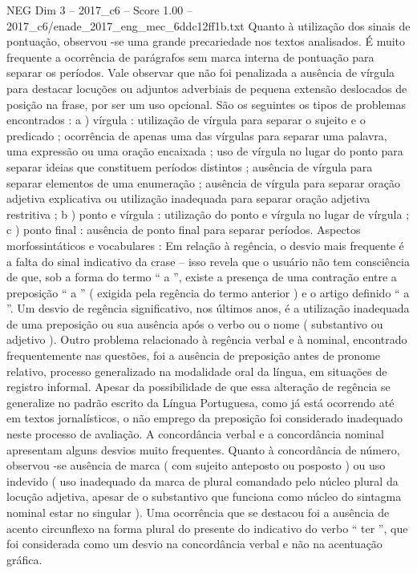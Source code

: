 \begin{textsample}{NEG Dim 3 – 2017\_c6 – Score 1.00 – 2017\_c6/enade\_2017\_eng\_mec\_6ddc12ff1b.txt}
Quanto à utilização dos sinais de pontuação, observou -se uma grande precariedade nos textos analisados.
É muito frequente a ocorrência de parágrafos sem marca interna de pontuação para separar os períodos.
Vale observar que não foi penalizada a ausência de vírgula para destacar locuções ou adjuntos adverbiais de pequena extensão deslocados de posição na frase, por ser um uso opcional.
São os seguintes os tipos de problemas encontrados : a ) vírgula : utilização de vírgula para separar o sujeito e o predicado ; ocorrência de apenas uma das vírgulas para separar uma palavra, uma expressão ou uma oração encaixada ; uso de vírgula no lugar do ponto para separar ideias que constituem períodos distintos ; ausência de vírgula para separar elementos de uma enumeração ; ausência de vírgula para separar oração adjetiva explicativa ou utilização inadequada para separar oração adjetiva restritiva ; b ) ponto e vírgula : utilização do ponto e vírgula no lugar de vírgula ; c ) ponto final : ausência de ponto final para separar períodos.
Aspectos morfossintáticos e vocabulares : Em relação à regência, o desvio mais frequente é a falta do sinal indicativo da crase – isso revela que o usuário não tem consciência de que, sob a forma do termo “ a ”, existe a presença de uma contração entre a preposição “ a ” ( exigida pela regência do termo anterior ) e o artigo definido “ a ”.
Um desvio de regência significativo, nos últimos anos, é a utilização inadequada de uma preposição ou sua ausência após o verbo ou o nome ( substantivo ou adjetivo ).
Outro problema relacionado à regência verbal e à nominal, encontrado frequentemente nas questões, foi a ausência de preposição antes de pronome relativo, processo generalizado na modalidade oral da língua, em situações de registro informal.
Apesar da possibilidade de que essa alteração de regência se generalize no padrão escrito da Língua Portuguesa, como já está ocorrendo até em textos jornalísticos, o não emprego da preposição foi considerado inadequado neste processo de avaliação.
A concordância verbal e a concordância nominal apresentam alguns desvios muito frequentes.
Quanto à concordância de número, observou -se ausência de marca ( com sujeito anteposto ou posposto ) ou uso indevido ( uso inadequado da marca de plural comandado pelo núcleo plural da locução adjetiva, apesar de o substantivo que funciona como núcleo do sintagma nominal estar no singular ).
Uma ocorrência que se destacou foi a ausência de acento circunflexo na forma plural do presente do indicativo do verbo “ ter ”, que foi considerada como um desvio na concordância verbal e não na acentuação gráfica.

\end{textsample}
